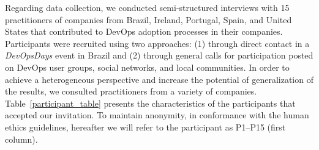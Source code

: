 Regarding data collection, we conducted semi-structured interviews with 15 practitioners of companies from
Brazil, Ireland, Portugal, Spain, and United States that
contributed to DevOps adoption processes in their companies. Participants
were recruited using two approaches: (1) through direct contact in a \emph{DevOpsDays}
event in Brazil and (2) through  general
calls for participation posted on DevOps user groups, social networks,
and local communities. In order to achieve a heterogeneous perspective
and increase the potential of generalization of the results,
we consulted practitioners from a variety of companies.
Table~\ref{participant_table} presents the characteristics of the participants
that accepted our invitation.
To maintain anonymity, in conformance with the human ethics guidelines,
hereafter we will refer to the participant as P1--P15 (first column).

